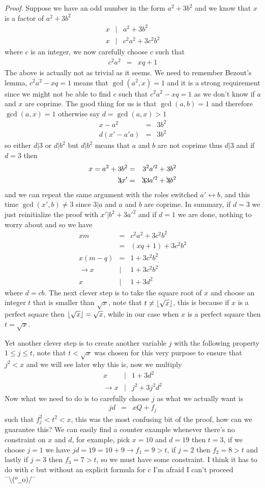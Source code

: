 \documentclass[aps,preprint,preprintnumbers,nofootinbib,showpacs,prd]{revtex4-1}
\newcommand{\nbea}{\begin{eqnarray*}}
\newcommand{\neea}{\end{eqnarray*}}
\newcommand{\dunno}{$ {}^{\mbox {--}}\backslash(^{\rm o}{}\underline{\hspace{0.2cm}}{\rm o})/^{\mbox {--}}$}
\DeclarePairedDelimiter{\floor}{\lfloor}{\rfloor}
\begin{document}
{\it Proof}. Suppose we have an odd number in the form $a^2 + 3b^2$ and we know that $x$ is a factor of $a^2 + 3b^2$
%
\nbea
 x &|& a^2 + 3b^2 \\
 x &|& c^2a^2 + 3c^2b^2
\neea
%
where $c$ is an integer, we now carefully choose $c$ such that
%
\nbea
c^2a^2 & = & xq + 1
\neea
%
The above is actually not as trivial as it seems. We need to remember Bezout's lemma, $c^2a^2 - xq = 1$ means that $\gcd(a^2,x)=1$ and it is a strong requirement since we might not be able to find $c$ such that $c^2a^2 - xq = 1$ as we don't know if $a$ and $x$ are coprime. The good thing for us is that $\gcd(a,b) = 1$ and therefore $\gcd(a,x)=1$ otherwise say $d = \gcd(a,x) > 1$
%
\nbea
x-a^2 & = & 3b^2 \\
d(x' - a'a) & = & 3b^2
\neea
%
so either $d|3$ or $d|b^2$ but $d|b^2$ means that $a$ and $b$ are not coprime thus $d|3$ and if $d=3$ then
%
\nbea
x = a^2 + 3b^2 & = & 3^2 a'^2 + 3b^2 \\
\bcancel{3} x' & = & \bcancel{3} 3a'^2 + \bcancel{3}b^2
\neea
%
and we can repeat the same argument with the roles switched $a' \leftrightarrow b$, and this time $\gcd(x',b) \neq 3$ since $3|a$ and $a$ and $b$ are coprime. In summary, if $d = 3$ we just reinitialize the proof with $x'|b^2 + 3a'^2$ and if $d=1$ we are done, nothing to worry about and so we have
%
\nbea
xm & = & c^2a^2 + 3c^2b^2 \\
& = & (xq + 1) + 3c^2b^2 \\
x (m - q) & = & 1 + 3c^2b^2 \\
\to x &|& 1 + 3c^2b^2 \\
x &|& 1 + 3d^2
\neea
%
where $d = cb$. The next clever step is to take the square root of $x$ and choose an integer $t$ that is smaller than $\sqrt{x}$, note that $t \neq \floor{\sqrt{x}}$, this is because if $x$ is a perfect square then $\floor{\sqrt{x}} = \sqrt{x}$, while in our case when $x$ is a perfect square then $t = \sqrt{x}$.

Yet another clever step is to create another variable $j$ with the following property $1 \le j \le t$, note that $t < \sqrt{x}$ was chosen for this very purpose to ensure that $j^2 < x$ and we will see later why this is, now we multiply
%
\nbea
x &|& 1 + 3d^2 \\
\to x &|& j^2 + 3 j^2d^2
\neea
%
Now what we need to do is to carefully choose $j$ as what we actually want is
%
\nbea
jd & = & xQ + f_j 
\neea
%
such that $f_j^2 < t^2 < x$, this was the most confusing bit of the proof, how can we guarantee this? We can easily find a counter example whenever there's no constraint on $x$ and $d$, for example, pick $x = 10$ and $d=19$ then $t = 3$, if we choose $j = 1$ we have $jd = 19 = 10 + 9 \to f_1 = 9 > t$, if $j=2$ then $f_2 = 8 > t$ and lastly if $j = 3$ then $f_3 = 7 > t$, so we must have some constraint. I think it has to do with $c$ but without an explicit formula for $c$ I'm afraid I can't proceed \dunno
\end{document}
